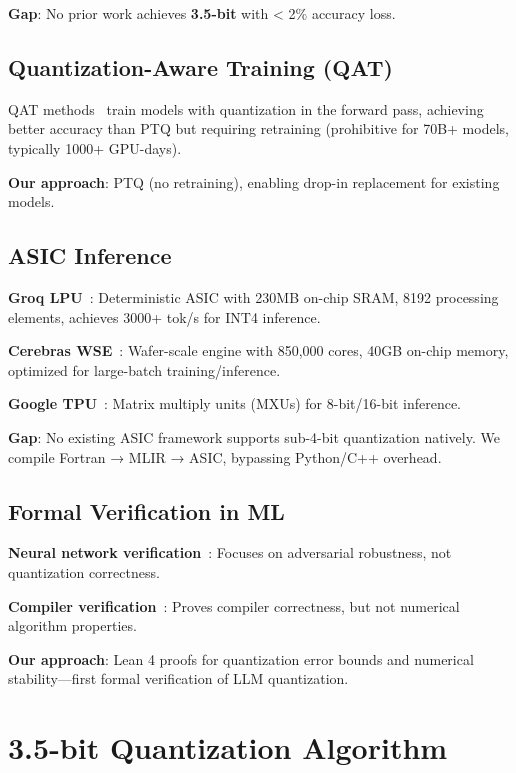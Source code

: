 \documentclass{article}
\begin{document}
\textbf{Gap}: No prior work achieves \textbf{3.5-bit} with < 2\% accuracy loss.

\subsection{Quantization-Aware Training (QAT)}

QAT methods~\cite{jacob2018quantization,zhang2020ternary} train models with quantization in the forward pass, achieving better accuracy than PTQ but requiring retraining (prohibitive for 70B+ models, typically 1000+ GPU-days).

\textbf{Our approach}: PTQ (no retraining), enabling drop-in replacement for existing models.

\subsection{ASIC Inference}

\textbf{Groq LPU}~\cite{groq2024lpu}: Deterministic ASIC with 230MB on-chip SRAM, 8192 processing elements, achieves 3000+ tok/s for INT4 inference.

\textbf{Cerebras WSE}~\cite{cerebras2024wse4}: Wafer-scale engine with 850,000 cores, 40GB on-chip memory, optimized for large-batch training/inference.

\textbf{Google TPU}~\cite{jouppi2017tpu}: Matrix multiply units (MXUs) for 8-bit/16-bit inference.

\textbf{Gap}: No existing ASIC framework supports sub-4-bit quantization natively. We compile Fortran → MLIR → ASIC, bypassing Python/C++ overhead.

\subsection{Formal Verification in ML}

\textbf{Neural network verification}~\cite{katz2017reluplex,wang2018formal}: Focuses on adversarial robustness, not quantization correctness.

\textbf{Compiler verification}~\cite{leroy2009compcert,kumar2014cakeml}: Proves compiler correctness, but not numerical algorithm properties.

\textbf{Our approach}: Lean 4 proofs for quantization error bounds and numerical stability—first formal verification of LLM quantization.

\section{3.5-bit Quantization Algorithm}
\label{sec:algorithm}
\end{document}
